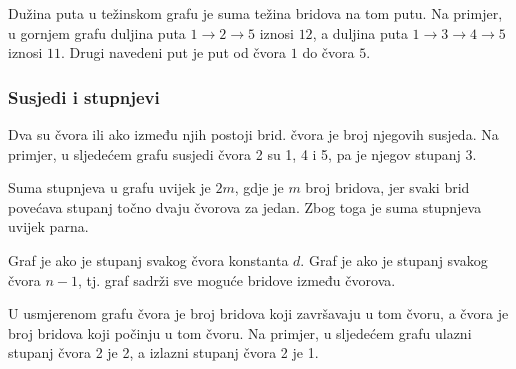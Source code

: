 Dužina puta u težinskom grafu
je suma težina bridova na tom putu.
Na primjer, u gornjem grafu
duljina puta
$1 \rightarrow 2 \rightarrow 5$ iznosi $12$,
a duljina puta
$1 \rightarrow 3 \rightarrow 4 \rightarrow 5$ iznosi $11$.
Drugi navedeni put je  put od čvora $1$ do čvora $5$.

\subsubsection{Susjedi i stupnjevi}


Dva su čvora  ili 
ako između njih postoji brid.
 čvora
je broj njegovih susjeda.
Na primjer, u sljedećem grafu
susjedi čvora 2 su 1, 4 i 5,
pa je njegov stupanj 3.

\begin{center}
\end{center}

Suma stupnjeva u grafu uvijek je $2m$,
gdje je $m$ broj bridova,
jer svaki brid
povećava stupanj točno dvaju čvorova za jedan.
Zbog toga je suma stupnjeva uvijek parna.


Graf je  ako je
stupanj svakog čvora konstanta $d$.
Graf je  ako je
stupanj svakog čvora $n-1$, tj.
graf sadrži sve moguće bridove
između čvorova.


U usmjerenom grafu 
čvora je broj bridova
koji završavaju u tom čvoru,
a  čvora
je broj bridova koji počinju u tom čvoru.
Na primjer, u sljedećem grafu
ulazni stupanj čvora 2 je 2,
a izlazni stupanj čvora 2 je 1.

\begin{center}
\end{center}

